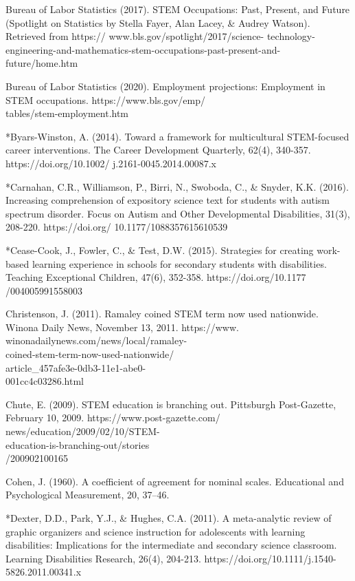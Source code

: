 \documentclass[11pt]{sig-alternate}
\begin{document}
\begin{large}
Bureau of Labor Statistics (2017). STEM Occupations: Past, Present, and Future (Spotlight on 
Statistics by Stella Fayer, Alan Lacey, \& Audrey Watson). Retrieved from https:// www.bls.gov/spotlight/2017/science- technology-engineering-and-mathematics-stem-occupations-past-present-and-future/home.htm

Bureau of Labor Statistics (2020). Employment projections: Employment in STEM occupations. 
https://www.bls.gov/emp/ \\
tables/stem-employment.htm

*Byars-Winston, A. (2014). Toward a framework for multicultural STEM-focused career 
interventions. The Career Development Quarterly, 62(4), 340-357.  
https://doi.org/10.1002/ j.2161-0045.2014.00087.x

*Carnahan, C.R., Williamson, P., Birri, N., Swoboda, C., \& Snyder, K.K. (2016). Increasing comprehension of expository science text for students with autism spectrum disorder. Focus on Autism and Other Developmental Disabilities, 31(3), 208-220. https://doi.org/ 10.1177/1088357615610539

*Cease-Cook, J., Fowler, C., \& Test, D.W. (2015). Strategies for creating work-based learning experience in schools for secondary students with disabilities. Teaching Exceptional Children, 47(6), 352-358. https://doi.org/10.1177 /004005991558003

Christenson, J. (2011). Ramaley coined STEM term now used nationwide. Winona Daily News, 
November 13, 2011. https://www. winonadailynews.com/news/local/ramaley- \\coined-stem-term-now-used-nationwide/\\article_457afe3e-0db3-11e1-abe0-\\001cc4c03286.html

Chute, E. (2009). STEM education is branching out. Pittsburgh Post-Gazette, February 10, 2009.
https://www.post-gazette.com/\\news/education/2009/02/10/STEM-\\education-is-branching-out/stories\\/200902100165

Cohen, J. (1960). A coefficient of agreement for nominal scales. Educational and Psychological 
Measurement, 20, 37–46. 

*Dexter, D.D., Park, Y.J., \& Hughes, C.A. (2011). A meta-analytic review of graphic organizers and science instruction for adolescents with learning disabilities: Implications for the intermediate and secondary science classroom. Learning Disabilities Research, 26(4), 204-213. https://doi.org/10.1111/j.1540-\\5826.2011.00341.x


\end{large}
\end{document}
